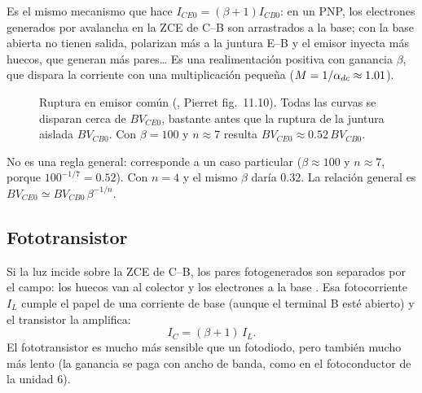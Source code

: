 \begin{intuicion}
Es el mismo mecanismo que hace $I_{CE0}=(\beta+1)I_{CB0}$: en un PNP, los electrones generados
por avalancha en la ZCE de C--B son arrastrados a la base; con la base abierta no tienen salida,
polarizan más a la juntura E--B y el emisor inyecta más huecos, que generan más pares\ldots{}
Es una realimentación positiva con ganancia $\beta$, que dispara la corriente con una
multiplicación pequeña ($M=1/\alpha_{dc}\approx1.01$).
\end{intuicion}

\begin{figure}[H]
\centering
{}
\caption{Ruptura en emisor común (, Pierret fig.~11.10). Todas las curvas se
disparan cerca de $BV_{CE0}$, bastante antes que la ruptura de la juntura aislada $BV_{CB0}$.
Con $\beta=100$ y $n\approx7$ resulta $BV_{CE0}\approx0.52\,BV_{CB0}$.}
\label{fig:avalancha}
\end{figure}

\begin{ojo}[``$BV_{CE0}=0.52\,BV_{CB0}$'' \diapo{2.8}]
No es una regla general: corresponde a un caso particular ($\beta\approx100$ y $n\approx7$,
porque $100^{-1/7}=0.52$). Con $n=4$ y el mismo $\beta$ daría $0.32$. La relación general es
$BV_{CE0}\simeq BV_{CB0}\,\beta^{-1/n}$.
\end{ojo}

\subsection{Fototransistor}

Si la luz incide sobre la ZCE de C--B, los pares fotogenerados son separados por el campo: los
huecos van al colector y los electrones a la base . Esa fotocorriente $I_L$ cumple
el papel de una corriente de base (aunque el terminal B esté abierto) y el transistor la
amplifica:
\[
  I_C = (\beta+1)\,I_L .
\]
El fototransistor es mucho más sensible que un fotodiodo, pero también mucho más lento (la
ganancia se paga con ancho de banda, como en el fotoconductor de la unidad 6).

